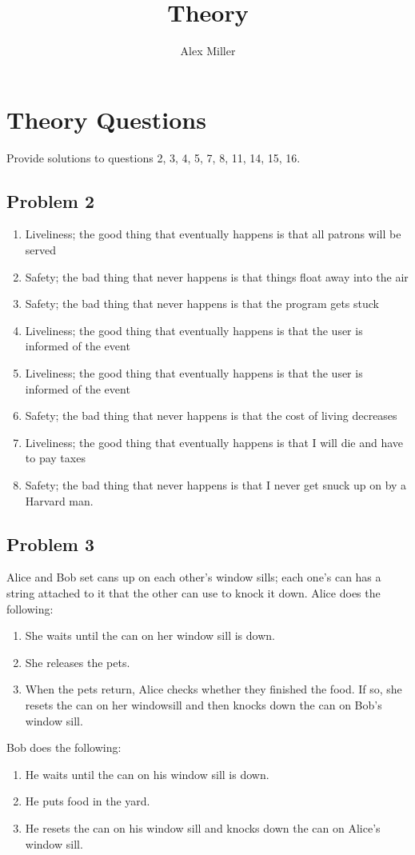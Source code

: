 \documentclass[]{article}
\title{Theory}
\author{Alex Miller}
\begin{document}
	\maketitle
	
\section{Theory Questions}
Provide solutions to questions 2, 3, 4, 5, 7, 8, 11, 14, 15, 16.

\subsection{Problem 2}
\begin{enumerate}
	\item Liveliness; the good thing that eventually happens is that all patrons will be served
	\item Safety; the bad thing that never happens is that things float away into the air
	\item Safety; the bad thing that never happens is that the program gets stuck
	\item Liveliness; the good thing that eventually happens is that the user is informed of the event
	\item Liveliness; the good thing that eventually happens is that the user is informed of the event
	\item Safety; the bad thing that never happens is that the cost of living decreases
	\item Liveliness; the good thing that eventually happens is that I will die and have to pay taxes 
	\item Safety; the bad thing that never happens is that I never get snuck up on by a Harvard man.
\end{enumerate}
\subsection{Problem 3}
Alice and Bob set cans up on each other's window sills; each one's can has a string attached to it that the other can use to knock it down.
Alice does the following:
\begin{enumerate}
	\item She waits until the can on her window sill is down.
	\item She releases the pets.
	\item When the pets return, Alice checks whether they finished the food. If so, she
	resets the can on her windowsill and then knocks down the can on Bob's window sill.
\end{enumerate}
Bob does the following:
\begin{enumerate}
	\item He waits until the can on his window sill is down.
	\item He puts food in the yard.
	\item He resets the can on his window sill and knocks down the can on Alice's window sill.
\end{enumerate}
\end{document}
